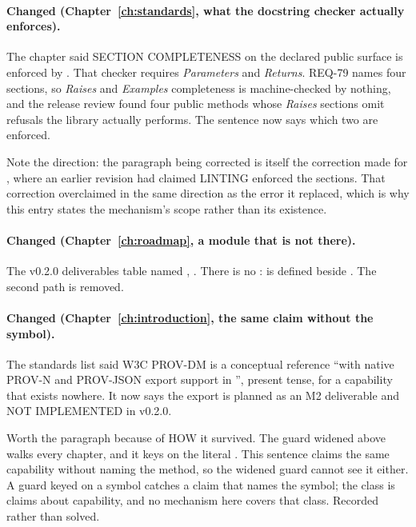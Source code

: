 \paragraph{Changed (Chapter~\ref{ch:standards}, what the docstring
checker actually enforces).} The chapter said SECTION COMPLETENESS on the
declared public surface is enforced by
. That checker requires
\emph{Parameters} and \emph{Returns}. REQ-79 names four sections, so
\emph{Raises} and \emph{Examples} completeness is machine-checked by
nothing, and the release review found four public methods whose
\emph{Raises} sections omit refusals the library actually performs. The
sentence now says which two are enforced.

Note the direction: the paragraph being corrected is itself the correction
made for , where an earlier revision had claimed LINTING
enforced the sections. That correction overclaimed in the same direction as
the error it replaced, which is why this entry states the mechanism's scope
rather than its existence.

\paragraph{Changed (Chapter~\ref{ch:roadmap}, a module that is not
there).} The v0.2.0 deliverables table named
, . There is no
:  is defined beside
. The second path is removed.

\paragraph{Changed (Chapter~\ref{ch:introduction}, the same claim
without the symbol).} The standards list said W3C PROV-DM is a conceptual
reference ``with native PROV-N and PROV-JSON export support in \itc{}'',
present tense, for a capability that exists nowhere. It now says the export
is planned as an M2 deliverable and NOT IMPLEMENTED in v0.2.0.

Worth the paragraph because of HOW it survived. The guard widened above walks
every chapter, and it keys on the literal . This
sentence claims the same capability without naming the method, so the widened
guard cannot see it either. A guard keyed on a symbol catches a claim that
names the symbol; the class is claims about capability, and no mechanism here
covers that class. Recorded rather than solved.

